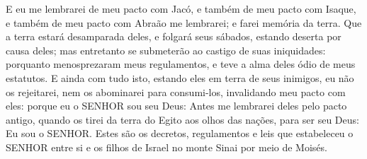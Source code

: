 {E eu me lembrarei de meu pacto com Jacó, e também de meu pacto com Isaque, e também de meu pacto com Abraão me lembrarei; e farei memória da terra.
Que a terra estará desamparada deles, e folgará seus sábados, estando deserta por causa deles; mas entretanto se submeterão ao castigo de suas iniquidades: porquanto menosprezaram meus regulamentos, e teve a alma deles ódio de meus estatutos.
E ainda com tudo isto, estando eles em terra de seus inimigos, eu não os rejeitarei, nem os abominarei para consumi-los, invalidando meu pacto com eles: porque eu o SENHOR sou seu Deus:
Antes me lembrarei deles pelo pacto antigo, quando os tirei da terra do Egito aos olhos das nações, para ser seu Deus: Eu sou o SENHOR.
Estes são os decretos, regulamentos e leis que estabeleceu o SENHOR entre si e os filhos de Israel no monte Sinai por meio de Moisés.

}
